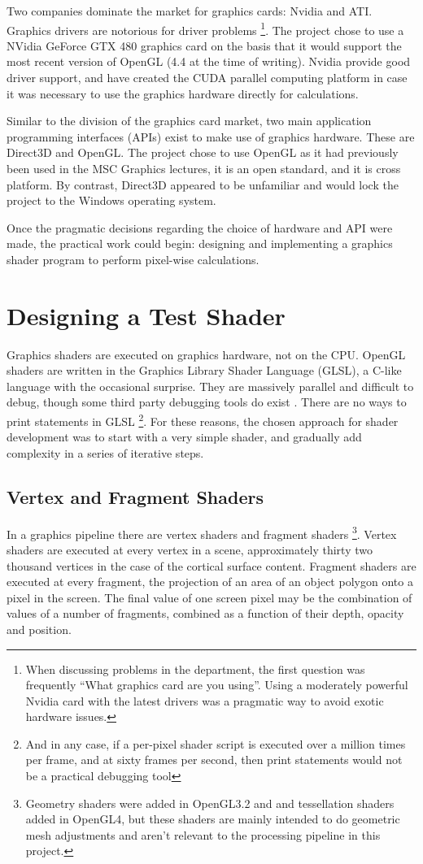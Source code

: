 \documentclass[MSc,paper=a4,pagesize=auto]{icldt}
\begin{document}
Two companies dominate the market for graphics cards: Nvidia and ATI. Graphics drivers are notorious for driver problems \footnote{When discussing problems in the department, the first question was frequently ``What graphics card are you using''. Using a moderately powerful Nvidia card with the latest drivers was a pragmatic way to avoid exotic hardware issues.}. The project chose to use a NVidia GeForce GTX 480 graphics card on the basis that it would support the most recent version of OpenGL (4.4 at the time of writing). Nvidia provide good driver support, and have created the CUDA parallel computing platform in case it was necessary to use the graphics hardware directly for calculations.

Similar to the division of the graphics card market, two main application programming interfaces (APIs) exist to make use of graphics hardware. These are Direct3D and OpenGL. The project chose to use OpenGL as it had previously been used in the MSC Graphics lectures, it is an open standard, and it is cross platform. By contrast, Direct3D appeared to be unfamiliar and would lock the project to the Windows operating system.

Once the pragmatic decisions regarding the choice of hardware and API were made, the practical work could begin: designing and implementing a graphics shader program to perform pixel-wise calculations.

\section{Designing a Test Shader}
Graphics shaders are executed on graphics hardware, not on the CPU. OpenGL shaders are written in the Graphics Library Shader Language (GLSL), a C-like language with the occasional surprise. They are massively parallel and difficult to debug, though some third party debugging tools do exist \cite{glslDevil}. There are no ways to print statements in GLSL \footnote{And in any case, if a per-pixel shader script is executed over a million times per frame, and at sixty frames per second, then print statements would not be a practical debugging tool}. For these reasons, the chosen approach for shader development was to start with a very simple shader, and gradually add complexity in a series of iterative steps. 

\subsection{Vertex and Fragment Shaders}
In a graphics pipeline there are vertex shaders and fragment shaders \footnote{Geometry shaders were added in OpenGL3.2 and and tessellation shaders added in OpenGL4, but these shaders are mainly intended to do geometric mesh adjustments and aren't relevant to the processing pipeline in this project.}. Vertex shaders are executed at every vertex in a scene, approximately thirty two thousand vertices in the case of the cortical surface content. Fragment shaders are executed at every fragment, the projection of an area of an object polygon onto a pixel in the screen. The final value of one screen pixel may be the combination of values of a number of fragments, combined as a function of their depth, opacity and position.
\end{document}
